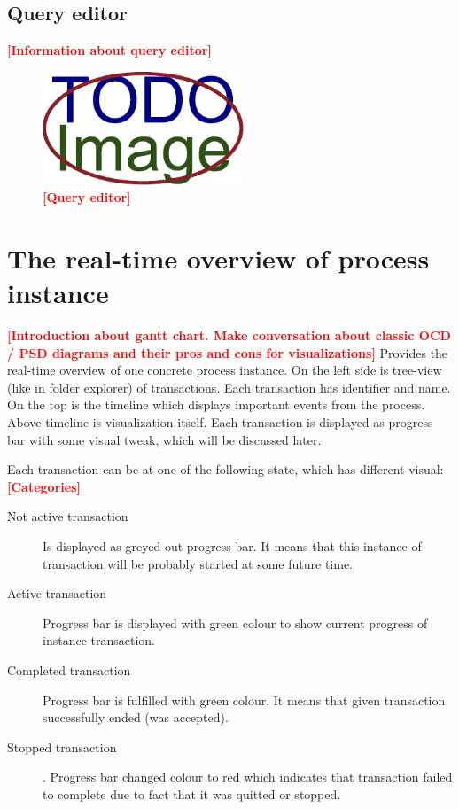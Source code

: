 \documentclass[thesis=B,english]{FITthesis}[2012/06/26]
\newcommand{\todo}[1]{\textcolor{red}{\textbf{[#1]}}}
\begin{document}
    \subsection{Query editor}
    
    \todo{Information about query editor}
    
    \begin{figure}[ht!]
          \centering
          \includegraphics[width=6cm,keepaspectratio]{img/TODO-image}
          \caption{\todo{Query editor}}
      \end{figure}   
    
    \section{The real-time overview of process instance}
    \todo{Introduction about gantt chart. Make conversation about classic OCD / PSD diagrams and their pros and cons for visualizations}
    Provides the real-time overview of one concrete process instance.
On the left side is tree-view (like in folder explorer) of transactions. Each transaction has identifier and name.
On the top is the timeline which displays important events from the process. Above timeline is visualization itself. Each transaction is displayed as progress bar with some visual tweak, which will be discussed later.

	Each transaction can be at one of the following state, which has different visual: 
	\todo{Categories}
    
    \begin{description}
    	\item[Not active transaction] Is displayed as greyed out progress bar. It means that this instance of transaction will be probably started at some future time.

        \item[Active transaction] Progress bar is displayed with green colour to show current progress of instance transaction. 
        
        \item[Completed transaction] Progress bar is fulfilled with green colour. It means that given transaction successfully ended (was accepted).
        
        \item[Stopped transaction]. Progress bar changed colour to red which indicates that transaction failed to complete due to fact that it was quitted or stopped. 
    \end{description}
    
\end{document}
